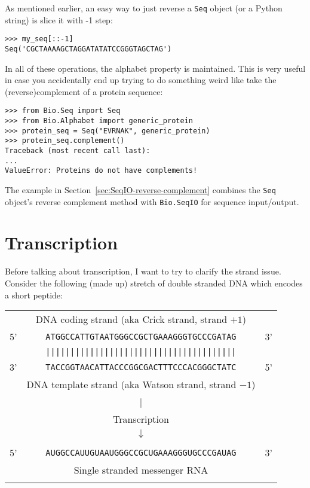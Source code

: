 As mentioned earlier, an easy way to just reverse a \verb|Seq| object (or a
Python string) is slice it with -1 step:

\begin{verbatim}
>>> my_seq[::-1]
Seq('CGCTAAAAGCTAGGATATATCCGGGTAGCTAG')
\end{verbatim}

In all of these operations, the alphabet property is maintained. This is very
useful in case you accidentally end up trying to do something weird like take
the (reverse)complement of a protein sequence:

\begin{verbatim}
>>> from Bio.Seq import Seq
>>> from Bio.Alphabet import generic_protein
>>> protein_seq = Seq("EVRNAK", generic_protein)
>>> protein_seq.complement()
Traceback (most recent call last):
...
ValueError: Proteins do not have complements!
\end{verbatim}

The example in Section~\ref{sec:SeqIO-reverse-complement} combines the \verb|Seq|
object's reverse complement method with \verb|Bio.SeqIO| for sequence input/output.

\section{Transcription}
Before talking about transcription, I want to try to clarify the strand issue.
Consider the following (made up) stretch of double stranded DNA which
encodes a short peptide:

\begin{tabular}{rcl}
\\
   & {\small DNA coding strand (aka Crick strand, strand $+1$)} & \\
5' & \texttt{ATGGCCATTGTAATGGGCCGCTGAAAGGGTGCCCGATAG} & 3' \\
   & \texttt{|||||||||||||||||||||||||||||||||||||||} & \\
3' & \texttt{TACCGGTAACATTACCCGGCGACTTTCCCACGGGCTATC} & 5' \\
   & {\small DNA template strand (aka Watson strand, strand $-1$)} & \\
\\
   & {\LARGE $|$} &\\
   & Transcription & \\
   & {\LARGE $\downarrow$} &\\
\\
5' & \texttt{AUGGCCAUUGUAAUGGGCCGCUGAAAGGGUGCCCGAUAG} & 3' \\
   & {\small Single stranded messenger RNA} & \\
\\
\end{tabular}

